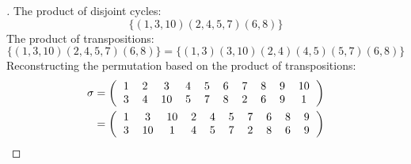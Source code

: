 \documentclass[paper=usletter, fontsize=12pt]{article}
\begin{document}
\begin{itemize}
\begin{itemize}
\begin{proof}[\unskip\nopunct]
                The product of disjoint cycles:
                \begin{equation*}
                    \{(1,3,10)(2,4,5,7)(6,8)\}
                \end{equation*}
                The product of transpositions:
                \begin{equation*}
                    \{(1,3,10)(2,4,5,7)(6,8)\} = \{(1,3)(3,10)(2,4)(4,5)(5,7)(6,8)\}
                \end{equation*}
                Reconstructing the permutation based on the product of transpositions:
                \begingroup
                \addtolength{\jot}{1em}
                \begin{align*}
                    \sigma &= \left(
                        \begin{tabular}{cccccccccc}
                            1 & 2 & 3 & 4 & 5 & 6 & 7 & 8 & 9 & 10 \\
                            3 & 4 & 10 & 5 & 7 & 8 & 2 & 6 & 9 & 1
                        \end{tabular}
                    \right) \\
                    & = \left(
                        \begin{tabular}{cccccccccc}
                            1 & 3 & 10 & 2 & 4 & 5 & 7 & 6 & 8 & 9 \\
                            3 & 10 & 1 & 4 & 5 & 7 & 2 & 8 & 6 & 9
                        \end{tabular}
                    \right)
                \end{align*}
                \endgroup


\end{proof}
\end{itemize}
\end{itemize}
\end{document}
